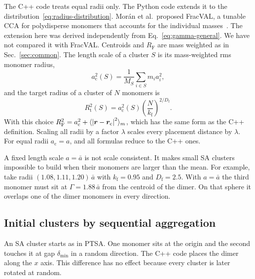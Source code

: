 \documentclass[11pt,a4paper]{article}
\newcommand{\abar}{\bar{a}}
\newcommand{\Df}{D_\text{f}}
\newcommand{\kf}{k_\text{f}}
\newcommand{\RF}{R_\text{F}}
\newcommand{\dmin}{\delta_\text{min}}
\begin{document}
The C++ code treats equal radii only.
The Python code extends it to the distribution~\eqref{eq:radius-distribution}.
Morán et al.\ proposed FracVAL, a tunable CCA for polydisperse monomers that accounts for the individual masses~\cite{moran2019}.
The extension here was derived independently from Eq.~\eqref{eq:gamma-general}.
We have not compared it with FracVAL.
Centroids and $\RF$ are mass weighted as in Sec.~\ref{sec:common}.
The length scale of a cluster $S$ is its mass-weighted rms monomer radius,
\begin{equation}
  a_\text{c}^2(S) = \frac{1}{M_S} \sum_{i \in S} m_i a_i^2 ,
  \label{eq:length-scale}
\end{equation}
and the target radius of a cluster of $N$ monomers is
\begin{equation}
  R_\text{t}^2(S) = a_\text{c}^2(S) \left( \frac{N}{\kf} \right)^{2/\Df} .
  \label{eq:tcca-target}
\end{equation}
With this choice $\RF^2 = a_\text{c}^2 + \langle \abs{\bm{r} - \bm{r}_\text{c}}^2 \rangle_m$, which has the same form as the C++ definition.
Scaling all radii by a factor $\lambda$ scales every placement distance by $\lambda$.
For equal radii $a_\text{c} = a$, and all formulas reduce to the C++ ones.

A fixed length scale $a = \abar$ is not scale consistent.
It makes small SA clusters impossible to build when their monomers are larger than the mean.
For example, take radii $(1.08, 1.11, 1.20)\,\abar$ with $\kf = 0.95$ and $\Df = 2.5$.
With $a = \abar$ the third monomer must sit at $\Gamma = 1.88\,\abar$ from the centroid of the dimer.
On that sphere it overlaps one of the dimer monomers in every direction.

\subsection{Initial clusters by sequential aggregation}
\label{sec:tcca-sa}

An SA cluster starts as in PTSA.
One monomer sits at the origin and the second touches it at gap $\dmin$ in a random direction.
The C++ code places the dimer along the $x$ axis.
This difference has no effect because every cluster is later rotated at random.
\end{document}
